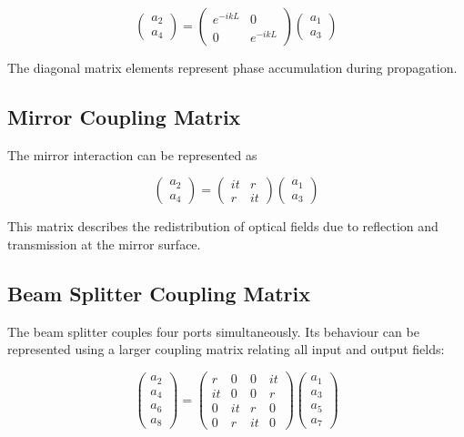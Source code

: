 \documentclass{report}
\begin{document}
\begin{equation}
\begin{pmatrix}
a_2\\
a_4
\end{pmatrix}
=
\begin{pmatrix}
e^{-ikL} & 0\\
0 & e^{-ikL}
\end{pmatrix}
\begin{pmatrix}
a_1\\
a_3
\end{pmatrix}
\end{equation}

The diagonal matrix elements represent phase accumulation during propagation.

\subsection{Mirror Coupling Matrix}

The mirror interaction can be represented as

\begin{equation}
\begin{pmatrix}
a_2\\
a_4
\end{pmatrix}
=
\begin{pmatrix}
it & r\\
r & it
\end{pmatrix}
\begin{pmatrix}
a_1\\
a_3
\end{pmatrix}
\end{equation}

This matrix describes the redistribution of optical fields due to reflection and transmission at the mirror surface.

\subsection{Beam Splitter Coupling Matrix}

The beam splitter couples four ports simultaneously. Its behaviour can be represented using a larger coupling matrix relating all input and output fields:

\begin{equation}
\begin{pmatrix}
a_2\\
a_4\\
a_6\\
a_8
\end{pmatrix}
=
\begin{pmatrix}
r & 0 & 0 & it\\
it & 0 & 0 & r\\
0 & it & r & 0\\
0 & r & it & 0
\end{pmatrix}
\begin{pmatrix}
a_1\\
a_3\\
a_5\\
a_7
\end{pmatrix}
\end{equation}
\end{document}
